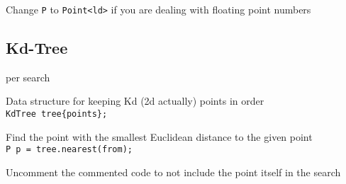 Change \verb|P| to \verb|Point<ld>| if you are dealing with floating point numbers


\subsection{Kd-Tree}
 per search

Data structure for keeping Kd (2d actually) points in order \\
\verb|KdTree tree{points};|

Find the point with the smallest Euclidean distance to the given point \\
\verb|P p = tree.nearest(from);|

Uncomment the commented code to not include the point itself in the search
